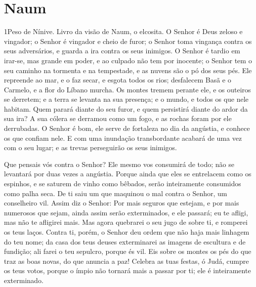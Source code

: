 \chapter{Naum}

\lettrine{1} Peso de Nínive. Livro da visão de Naum, o
elcosita.  O Senhor é Deus zeloso e vingador; o
Senhor é vingador e cheio de furor; o Senhor toma vingança contra os
seus adversários, e guarda a ira contra os seus inimigos. O
Senhor é tardio em irar-se, mas grande em poder, e ao culpado não
tem por inocente; o Senhor tem o seu caminho na tormenta e na
tempestade, e as nuvens são o pó dos seus pés. Ele repreende ao
mar, e o faz secar, e esgota todos os rios; desfalecem Basã e o
Carmelo, e a flor do Líbano murcha. Os montes tremem perante
ele, e os outeiros se derretem; e a terra se levanta na sua
presença; e o mundo, e todos os que nele habitam. Quem parará
diante do seu furor, e quem persistirá diante do ardor da sua ira? A
sua cólera se derramou como um fogo, e as rochas foram por ele
derrubadas. O Senhor é bom, ele serve de fortaleza no dia da
angústia, e conhece os que confiam nele. E com uma inundação
transbordante acabará de uma vez com o seu lugar; e as trevas
perseguirão os seus inimigos.

Que pensais vós contra o Senhor? Ele mesmo vos consumirá de todo;
não se levantará por duas vezes a angústia. Porque ainda que
eles se entrelacem como os espinhos, e se saturem de vinho como
bêbados, serão inteiramente consumidos como palha seca. De ti
saiu um que maquinou o mal contra o Senhor, um conselheiro vil.
Assim diz o Senhor: Por mais seguros que estejam, e por mais
numerosos que sejam, ainda assim serão exterminados, e ele passará;
eu te afligi, mas não te afligirei mais. Mas agora quebrarei
o seu jugo de sobre ti, e romperei os teus laços. Contra ti,
porém, o Senhor deu ordem que não haja mais linhagem do teu nome; da
casa dos teus deuses exterminarei as imagens de escultura e de
fundição; ali farei o teu sepulcro, porque és vil. Eis sobre
os montes os pés do que traz as boas novas, do que anuncia a paz!
Celebra as tuas festas, ó Judá, cumpre os teus votos, porque o ímpio
não tornará mais a passar por ti; ele é inteiramente exterminado.

\medskip

